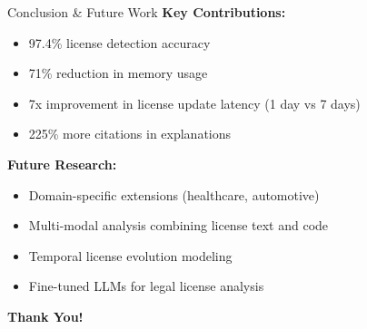 \documentclass{beamer}
\begin{document}
\begin{frame}{Conclusion \& Future Work}
\textbf{Key Contributions:}
\begin{itemize}
\item 97.4\% license detection accuracy
\item 71\% reduction in memory usage
\item 7x improvement in license update latency (1 day vs 7 days)
\item 225\% more citations in explanations
\end{itemize}

\textbf{Future Research:}
\begin{itemize}
\item Domain-specific extensions (healthcare, automotive)
\item Multi-modal analysis combining license text and code
\item Temporal license evolution modeling
\item Fine-tuned LLMs for legal license analysis
\end{itemize}

\textbf{Thank You!}
\end{frame}
\end{document}
